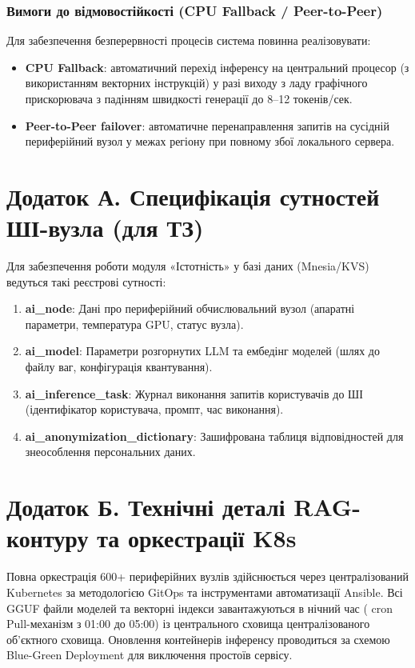 \documentclass{article}
\begin{document}
\subsubsection{Вимоги до відмовостійкості (CPU Fallback / Peer-to-Peer)}
Для забезпечення безперервності процесів система повинна реалізовувати:
\begin{itemize}
    \item \textbf{CPU Fallback}: автоматичний перехід інференсу на центральний процесор (з використанням векторних інструкцій) у разі виходу з ладу графічного прискорювача з падінням швидкості генерації до 8--12 токенів/сек.
    \item \textbf{Peer-to-Peer failover}: автоматичне перенаправлення запитів на сусідній периферійний вузол у межах регіону при повному збої локального сервера.
\end{itemize}

\newpage
\section{Додаток А. Специфікація сутностей ШІ-вузла (для ТЗ)}

Для забезпечення роботи модуля «Істотність» у базі даних (Mnesia/KVS) ведуться такі реєстрові сутності:
\begin{enumerate}
    \item \textbf{ai\_node}: Дані про периферійний обчислювальний вузол (апаратні параметри, температура GPU, статус вузла).
    \item \textbf{ai\_model}: Параметри розгорнутих LLM та ембедінг моделей (шлях до файлу ваг, конфігурація квантування).
    \item \textbf{ai\_inference\_task}: Журнал виконання запитів користувачів до ШІ (ідентифікатор користувача, промпт, час виконання).
    \item \textbf{ai\_anonymization\_dictionary}: Зашифрована таблиця відповідностей для знеособлення персональних даних.
\end{enumerate}

\section{Додаток Б. Технічні деталі RAG-контуру та оркестрації K8s}

Повна оркестрація 600+ периферійних вузлів здійснюється через централізований Kubernetes за методологією GitOps та інструментами автоматизації Ansible. Всі GGUF файли моделей та векторні індекси завантажуються в нічний час ( cron Pull-механізм з 01:00 до 05:00) із центрального сховища централізованого об'єктного сховища. Оновлення контейнерів інференсу проводиться за схемою Blue-Green Deployment для виключення простоїв сервісу.
\end{document}
